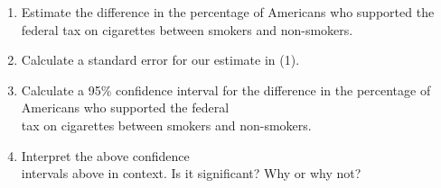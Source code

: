 \documentclass[11pt, chapterprefix=true]{scrbook}\usepackage[]{graphicx}\usepackage[]{color}
\begin{document}
\begin{exercises}
\begin{exercise}
	  \begin{enumerate}
	  \item Estimate the difference in the percentage of Americans who supported the \\ federal tax on cigarettes between smokers and non-smokers.
    \item Calculate a standard error for our estimate in (1).
    \item Calculate a 95\% confidence interval for the difference in the percentage of \\ Americans who supported the federal \\ tax on cigarettes between smokers and non-smokers.
    \item Interpret the above confidence \\ intervals above in context.  Is it significant? Why or why not?
	  \end{enumerate}

	\end{exercise}
%
%


\end{exercises}
\end{document}
